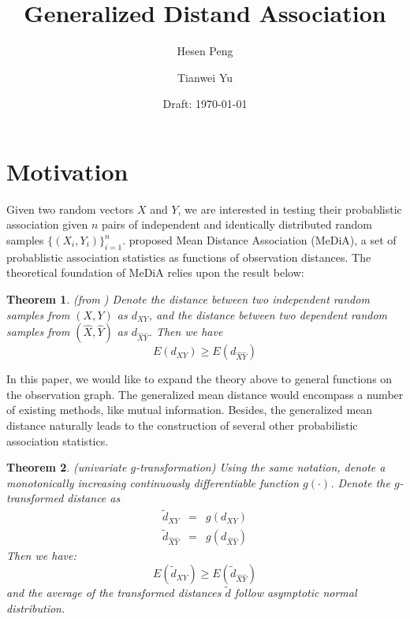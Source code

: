 \documentclass[12pt,letterpaper]{article}
\newtheorem{thm}{Theorem}
\begin{document}


\title{Generalized Distand Association} 
\author{Hesen Peng \and Tianwei Yu}
\date{Draft: \today{}} 
\maketitle{}

\begin{abstract}
  
\end{abstract}

\section{Motivation}
\label{sec:motivation}

Given two random vectors $X$ and $Y$, we are interested in testing
their probablistic association given $n$ pairs of independent and
identically distributed random samples $\{(X_i, Y_i)\}_{i=1}^n$.
\cite{cite:10.1371/journal.pone.0124620} proposed Mean Distance
Association (MeDiA), a set of probablistic association statistics as
functions of observation distances. The theoretical foundation of
MeDiA relies upon the result below: 

\begin{thm}
  \label{thm:1} 
  (from \cite{cite:10.1371/journal.pone.0124620}) Denote the distance
  between two independent random samples from $(X,Y)$ as $d_{XY}$, and
  the distance between two dependent random samples from
  $(\hat{X},\hat{Y})$ as $d_{\hat{X}\hat{Y}}$. Then we have
  \begin{displaymath}
    E(d_{XY}) \ge E(d_{\hat{X}\hat{Y}})
  \end{displaymath}
\end{thm}

In this paper, we would like to expand the theory above to general
functions on the observation graph. The generalized mean distance
would encompass a number of existing methods, like mutual
information. Besides, the generalized mean distance naturally leads to
the construction of several other probabilistic association
statistics.

\begin{thm}
  \label{thm:2}
  (univariate $g$-transformation) Using the same notation, denote a
  monotonically increasing continuously differentiable function
  $g(\cdot)$. Denote the $g$-transformed distance as
  \begin{eqnarray*}
    \tilde{d}_{XY} &=& g(d_{XY})\\
    \tilde{d}_{\hat{X}\hat{Y}} &=& g(d_{\hat{X}\hat{Y}})
  \end{eqnarray*}
  Then we have:
  \begin{displaymath}
    E(\tilde{d}_{XY}) \ge E(\tilde{d}_{\hat{X}\hat{Y}})
  \end{displaymath}
  and the average of the transformed distances $\tilde{d}$ follow
  asymptotic normal distribution.
\end{thm}
\end{document}
